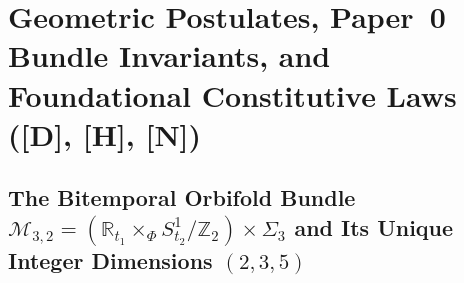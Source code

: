 \documentclass[11pt,a4paper]{article}
\newcommand{\catD}{\textbf{\textcolor{blue!75!black}{[D]}}}
\newcommand{\catH}{\textbf{\textcolor{orange!85!black}{[H]}}}
\newcommand{\catN}{\textbf{\textcolor{teal!75!black}{[N]}}}
\theoremstyle{definition}
\theoremstyle{remark}
\begin{document}
\section{\texorpdfstring{Geometric Postulates, Paper~0 Bundle Invariants, and Foundational Constitutive Laws (\catD, \catH, \catN)}{Geometric Postulates, Paper 0 Bundle Invariants, and Foundational Constitutive Laws}}
\label{sec:postulates}

\subsection{\texorpdfstring{The Bitemporal Orbifold Bundle $\mathcal{M}_{3,2} = (\mathbb{R}_{t_1} \times_{\Phi} S^1_{t_2}/\mathbb{Z}_2) \times \Sigma_3$ and Its Unique Integer Dimensions $(2,3,5)$}{The Bitemporal Orbifold Bundle and Its Unique Integer Dimensions (2,3,5)}}
\end{document}
